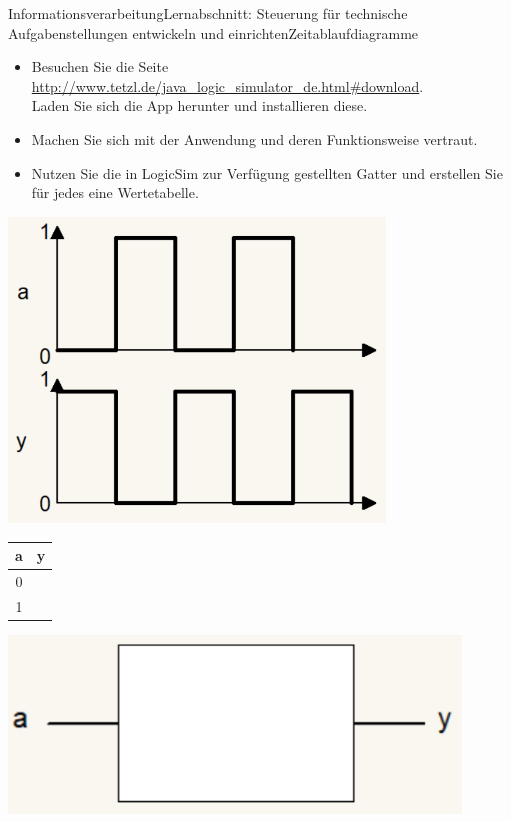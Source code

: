 \documentclass[oneside,openany,headings=optiontotoc,11pt,numbers=noenddot]{scrreprt}
\begin{document}
	\begin{worksheet}{Informationsverarbeitung}{Lernabschnitt: Steuerung für technische Aufgabenstellungen entwickeln und einrichten}{Zeitablaufdiagramme}
		\begin{framed}
			\noindent
			\begin{itemize}
				\item  Besuchen Sie die Seite \url{http://www.tetzl.de/java_logic_simulator_de.html#download}.\\
				Laden Sie sich die App herunter und installieren diese.
				\item Machen Sie sich mit der Anwendung und deren Funktionsweise vertraut.
				\item Nutzen Sie die in LogicSim zur Verfügung gestellten Gatter und erstellen Sie für jedes eine Wertetabelle.
			\end{itemize}
		\end{framed}
		\begin{framed}
			\noindent
			\begin{minipage}{0.35\textwidth}
				\includegraphics[width=0.75\textwidth]{99_Bilder/04_TI/04_01.png}
			\end{minipage}
			\hfill
			\begin{minipage}{0.65\textwidth}
				\begin{minipage}{0.25\textwidth}
					\begin{tabular}{c|c}
						a & y\\
						\hline
						0 & \\
						1 & 
					\end{tabular}
				\end{minipage}
				\hfill
				\begin{minipage}{0.65\textwidth}
					\includegraphics[width=0.9\textwidth]{99_Bilder/04_TI/04_01_G.png}

\end{minipage}
\end{minipage}
\end{framed}
\end{worksheet}
\end{document}
